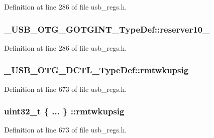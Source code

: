 Definition at line 286 of file usb\-\_\-regs.\-h.

\hypertarget{group___u_s_b___o_t_g___d_r_i_v_e_r_gae428c081adf043cb149c9d1dd45c1a99}{
\subsubsection[{reserver10\-\_\-16}]{ \-\_\-\-U\-S\-B\-\_\-\-O\-T\-G\-\_\-\-G\-O\-T\-G\-I\-N\-T\-\_\-\-Type\-Def\-::reserver10\-\_}}\label{group___u_s_b___o_t_g___d_r_i_v_e_r_gae428c081adf043cb149c9d1dd45c1a99}


Definition at line 286 of file usb\-\_\-regs.\-h.

\hypertarget{group___u_s_b___o_t_g___d_r_i_v_e_r_gabb9a7d82a51be5c6bde5ec9e107ae756}{
\subsubsection[{rmtwkupsig}]{ \-\_\-\-U\-S\-B\-\_\-\-O\-T\-G\-\_\-\-D\-C\-T\-L\-\_\-\-Type\-Def\-::rmtwkupsig}}\label{group___u_s_b___o_t_g___d_r_i_v_e_r_gabb9a7d82a51be5c6bde5ec9e107ae756}


Definition at line 673 of file usb\-\_\-regs.\-h.

\hypertarget{group___u_s_b___o_t_g___d_r_i_v_e_r_ga8ccc5049abd36ce8f721ad8876abb9e7}{
\subsubsection[{rmtwkupsig}]{\setlength{\rightskip}{0pt plus 5cm}uint32\-\_\-t \{ ... \} \-::rmtwkupsig}}\label{group___u_s_b___o_t_g___d_r_i_v_e_r_ga8ccc5049abd36ce8f721ad8876abb9e7}


Definition at line 673 of file usb\-\_\-regs.\-h.

